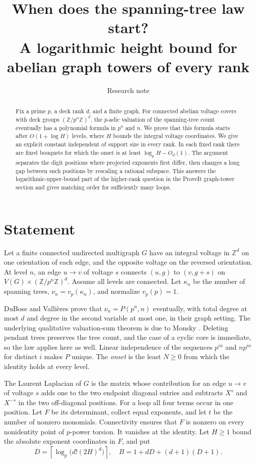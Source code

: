 \documentclass[11pt]{article}
\title{When does the spanning-tree law start?\\
\large A logarithmic height bound for abelian graph towers of every rank}
\author{Research note}
\date{}
\newcommand{\Z}{\mathbb Z}
\begin{document}
\maketitle
\begin{abstract}
Fix a prime $p$, a deck rank $d$, and a finite graph. For connected abelian voltage covers with deck groups $(\Z/p^n\Z)^d$, the $p$-adic valuation of the spanning-tree count eventually has a polynomial formula in $p^n$ and $n$. We prove that this formula starts after $O(1+\log H)$ levels, where $H$ bounds the integral voltage coordinates. We give an explicit constant independent of support size in every rank. In each fixed rank there are fixed bouquets for which the onset is at least $\log_p H-O_d(1)$. The argument separates the digit positions where projected exponents first differ, then changes a long gap between such positions by rescaling a rational subspace. This answers the logarithmic-upper-bound part of the higher-rank question in the ProveIt graph-tower section and gives matching order for sufficiently many loops.
\end{abstract}

\section{Statement}
Let a finite connected undirected multigraph $G$ have an integral voltage in $\Z^d$ on one orientation of each edge, and the opposite voltage on the reversed orientation. At level $n$, an edge $u\to v$ of voltage $s$ connects $(u,g)$ to $(v,g+s)$ on $V(G)\times (\Z/p^n\Z)^d$. Assume all levels are connected. Let $\kappa_n$ be the number of spanning trees, $\nu_n=v_p(\kappa_n)$, and normalize $v_p(p)=1$.

DuBose and Vallières \cite[Theorem 6.2]{DV} prove that $\nu_n=P(p^n,n)$ eventually, with total degree at most $d$ and degree in the second variable at most one, in their graph setting. The underlying qualitative valuation-sum theorem is due to Monsky \cite[Theorem 5.6]{Monsky}. Deleting pendant trees preserves the tree count, and the case of a cyclic core is immediate, so the law applies here as well. Linear independence of the sequences $p^{in}$ and $np^{in}$ for distinct $i$ makes $P$ unique. The \emph{onset} is the least $N\ge0$ from which the identity holds at every level.

The Laurent Laplacian of $G$ is the matrix whose contribution for an edge $u\to v$ of voltage $s$ adds one to the two endpoint diagonal entries and subtracts $X^s$ and $X^{-s}$ in the two off-diagonal positions. For a loop all four terms occur in one position. Let $F$ be its determinant, collect equal exponents, and let $t$ be the number of nonzero monomials. Connectivity ensures that $F$ is nonzero on every nonidentity point of $p$-power torsion. It vanishes at the identity. Let $H\ge1$ bound the absolute exponent coordinates in $F$, and put
\begin{equation}\label{bounds}
D=\left\lceil\log_p\big(d!(2H)^d\big)\right\rceil,\quad
B=1+dD+(d+1)(D+1).
\end{equation}
\end{document}
